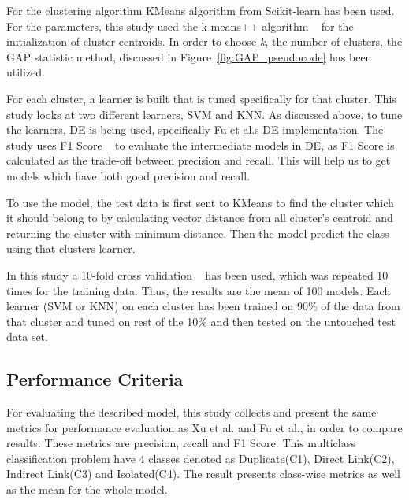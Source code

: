 \documentclass[sigconf]{acmart}
\theoremstyle{break}
\begin{document}
    For the clustering algorithm KMeans algorithm from Scikit-learn has been used. For the parameters, this study used the k-means++ algorithm ~\cite{arthur2007k} for the initialization of cluster centroids. In order to choose {\em k}, the number of clusters, the GAP statistic method, discussed in Figure~\ref{fig:GAP_pseudocode} has been utilized.
    
    For each cluster, a learner is built that is tuned specifically for that cluster. This study looks at two different learners, SVM and KNN. As discussed above, to tune the learners, DE is being used, specifically Fu et al.\textquotesingle s DE implementation. The study uses F1 Score ~\cite{sokolova2006beyond} to evaluate the intermediate models in DE, as F1 Score is calculated as the trade-off between precision and recall. This will help us to get models which have both good precision and recall.
    
   
    
    To use the model, the test data is first sent to KMeans to find the cluster which it should belong to by calculating vector distance from all cluster's centroid and returning the cluster with minimum distance. Then the model predict the class using that cluster\textquotesingle s learner.
    
    In this study a 10-fold cross validation ~\cite{kohavi1995study} has been used, which was repeated 10 times for the training data. Thus, the results are the mean of 100 models. Each learner (SVM or KNN) on each cluster has been trained on 90\% of the data from that cluster and tuned on rest of the 10\% and then tested on the untouched test data set. 
    

    
    \subsection{Performance Criteria}
    \label{sssec:performance_criteria}
    For evaluating the described model, this study collects and present the same metrics for performance evaluation as Xu et al. and Fu et al., in order to compare results. These metrics are precision, recall and F1 Score. This multiclass classification problem have 4 classes denoted as Duplicate(C1), Direct Link(C2), Indirect Link(C3) and Isolated(C4). The result presents class-wise metrics as well as the mean for the whole model.
    
\end{document}
